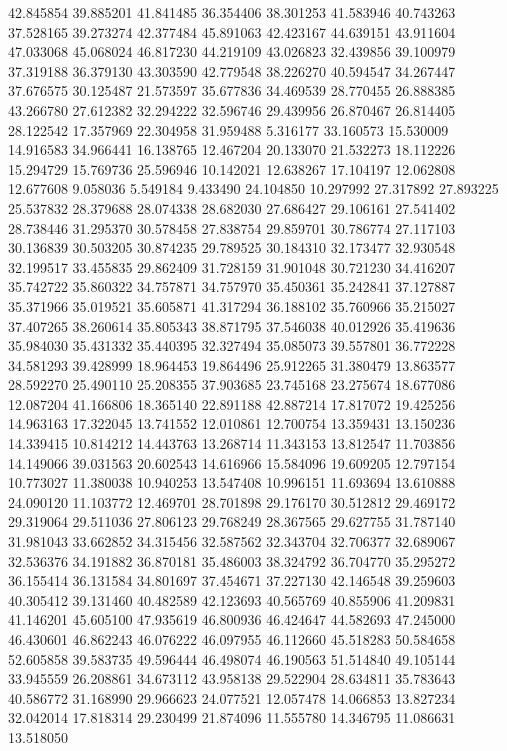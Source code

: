 42.845854
39.885201
41.841485
36.354406
38.301253
41.583946
40.743263
37.528165
39.273274
42.377484
45.891063
42.423167
44.639151
43.911604
47.033068
45.068024
46.817230
44.219109
43.026823
32.439856
39.100979
37.319188
36.379130
43.303590
42.779548
38.226270
40.594547
34.267447
37.676575
30.125487
21.573597
35.677836
34.469539
28.770455
26.888385
43.266780
27.612382
32.294222
32.596746
29.439956
26.870467
26.814405
28.122542
17.357969
22.304958
31.959488
5.316177
33.160573
15.530009
14.916583
34.966441
16.138765
12.467204
20.133070
21.532273
18.112226
15.294729
15.769736
25.596946
10.142021
12.638267
17.104197
12.062808
12.677608
9.058036
5.549184
9.433490
24.104850
10.297992
27.317892
27.893225
25.537832
28.379688
28.074338
28.682030
27.686427
29.106161
27.541402
28.738446
31.295370
30.578458
27.838754
29.859701
30.786774
27.117103
30.136839
30.503205
30.874235
29.789525
30.184310
32.173477
32.930548
32.199517
33.455835
29.862409
31.728159
31.901048
30.721230
34.416207
35.742722
35.860322
34.757871
34.757970
35.450361
35.242841
37.127887
35.371966
35.019521
35.605871
41.317294
36.188102
35.760966
35.215027
37.407265
38.260614
35.805343
38.871795
37.546038
40.012926
35.419636
35.984030
35.431332
35.440395
32.327494
35.085073
39.557801
36.772228
34.581293
39.428999
18.964453
19.864496
25.912265
31.380479
13.863577
28.592270
25.490110
25.208355
37.903685
23.745168
23.275674
18.677086
12.087204
41.166806
18.365140
22.891188
42.887214
17.817072
19.425256
14.963163
17.322045
13.741552
12.010861
12.700754
13.359431
13.150236
14.339415
10.814212
14.443763
13.268714
11.343153
13.812547
11.703856
14.149066
39.031563
20.602543
14.616966
15.584096
19.609205
12.797154
10.773027
11.380038
10.940253
13.547408
10.996151
11.693694
13.610888
24.090120
11.103772
12.469701
28.701898
29.176170
30.512812
29.469172
29.319064
29.511036
27.806123
29.768249
28.367565
29.627755
31.787140
31.981043
33.662852
34.315456
32.587562
32.343704
32.706377
32.689067
32.536376
34.191882
36.870181
35.486003
38.324792
36.704770
35.295272
36.155414
36.131584
34.801697
37.454671
37.227130
42.146548
39.259603
40.305412
39.131460
40.482589
42.123693
40.565769
40.855906
41.209831
41.146201
45.605100
47.935619
46.800936
46.424647
44.582693
47.245000
46.430601
46.862243
46.076222
46.097955
46.112660
45.518283
50.584658
52.605858
39.583735
49.596444
46.498074
46.190563
51.514840
49.105144
33.945559
26.208861
34.673112
43.958138
29.522904
28.634811
35.783643
40.586772
31.168990
29.966623
24.077521
12.057478
14.066853
13.827234
32.042014
17.818314
29.230499
21.874096
11.555780
14.346795
11.086631
13.518050

